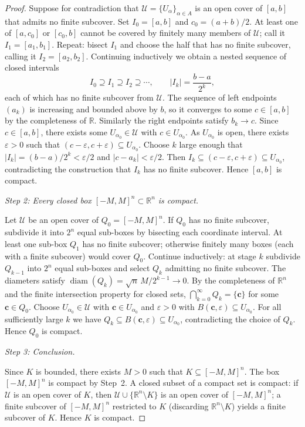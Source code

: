 \documentclass{article}
\theoremstyle{definition}
\theoremstyle{remark}
\begin{document}
\begin{proof}
Suppose for contradiction that $\mathcal{U} = \{U_\alpha\}_{\alpha \in A}$ is an
open cover of $[a, b]$ that admits no finite subcover.
Set $I_0 = [a, b]$ and $c_0 = (a+b)/2$.
At least one of $[a, c_0]$ or $[c_0, b]$ cannot be covered by finitely many
members of $\mathcal{U}$; call it $I_1 = [a_1, b_1]$.
Repeat: bisect $I_1$ and choose the half that has no finite subcover, calling
it $I_2 = [a_2, b_2]$.
Continuing inductively we obtain a nested sequence of closed intervals
\[
    I_0 \supseteq I_1 \supseteq I_2 \supseteq \cdots,
    \qquad |I_k| = \frac{b-a}{2^k},
\]
each of which has no finite subcover from $\mathcal{U}$.
The sequence of left endpoints $(a_k)$ is increasing and bounded above by
$b$, so it converges to some $c \in [a, b]$ by the completeness of
$\mathbb{R}$.
Similarly the right endpoints satisfy $b_k \to c$.
Since $c \in [a, b]$, there exists some $U_{\alpha_0} \in \mathcal{U}$
with $c \in U_{\alpha_0}$.
As $U_{\alpha_0}$ is open, there exists $\varepsilon > 0$ such that
$(c - \varepsilon, c + \varepsilon) \subseteq U_{\alpha_0}$.
Choose $k$ large enough that $|I_k| = (b-a)/2^k < \varepsilon/2$ and
$|c - a_k| < \varepsilon/2$.
Then $I_k \subseteq (c - \varepsilon, c + \varepsilon) \subseteq U_{\alpha_0}$,
contradicting the construction that $I_k$ has no finite subcover.
Hence $[a, b]$ is compact.

\smallskip
\textit{Step 2: Every closed box $[-M, M]^n \subset \mathbb{R}^n$ is compact.}

Let $\mathcal{U}$ be an open cover of $Q_0 = [-M, M]^n$.
If $Q_0$ has no finite subcover, subdivide it into $2^n$ equal sub-boxes
by bisecting each coordinate interval.
At least one sub-box $Q_1$ has no finite subcover; otherwise finitely many
boxes (each with a finite subcover) would cover $Q_0$.
Continue inductively: at stage $k$ subdivide $Q_{k-1}$ into $2^n$ equal
sub-boxes and select $Q_k$ admitting no finite subcover.
The diameters satisfy $\operatorname{diam}(Q_k) = \sqrt{n}\,M/2^{k-1} \to 0$.
By the completeness of $\mathbb{R}^n$ and the finite intersection property
for closed sets, $\bigcap_{k=0}^\infty Q_k = \{\mathbf{c}\}$ for some
$\mathbf{c} \in Q_0$.
Choose $U_{\alpha_0} \in \mathcal{U}$ with $\mathbf{c} \in U_{\alpha_0}$ and
$\varepsilon > 0$ with $B(\mathbf{c}, \varepsilon) \subseteq U_{\alpha_0}$.
For all sufficiently large $k$ we have
$Q_k \subseteq B(\mathbf{c}, \varepsilon) \subseteq U_{\alpha_0}$,
contradicting the choice of $Q_k$.
Hence $Q_0$ is compact.

\smallskip
\textit{Step 3: Conclusion.}

Since $K$ is bounded, there exists $M > 0$ such that
$K \subseteq [-M, M]^n$.
The box $[-M, M]^n$ is compact by Step~2.
A closed subset of a compact set is compact: if $\mathcal{U}$ is an open
cover of $K$, then $\mathcal{U} \cup \{\mathbb{R}^n \setminus K\}$ is an open
cover of $[-M, M]^n$; a finite subcover of $[-M, M]^n$ restricted to $K$
(discarding $\mathbb{R}^n \setminus K$) yields a finite subcover of $K$.
Hence $K$ is compact.
\end{proof}
\end{document}
